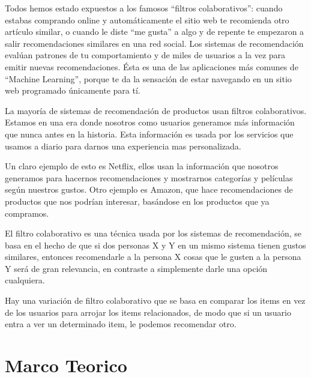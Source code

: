 \documentclass[preprint,12pt]{elsarticle}
\begin{document}
Todos hemos estado expuestos a los famosos “filtros colaborativos”: cuando estabas comprando online y automáticamente el sitio web te recomienda otro artículo similar, o cuando le diste “me gusta” a algo y de repente te empezaron a salir recomendaciones similares en una red social. Los sistemas de recomendación evalúan patrones de tu comportamiento y de miles de usuarios a la vez para emitir nuevas recomendaciones. Ésta es una de las aplicaciones más comunes de “Machine Learning”, porque te da la sensación de estar navegando en un sitio web programado únicamente para tí.

La mayoría de sistemas de recomendación de productos usan filtros colaborativos. Estamos en una era donde nosotros como usuarios generamos más información que nunca antes en la historia. Esta información es usada por los servicios que usamos a diario para darnos una experiencia mas personalizada.

Un claro ejemplo de esto es Netflix, ellos usan la información que nosotros generamos para hacernos recomendaciones y mostrarnos categorías y películas según nuestros gustos. Otro ejemplo es Amazon, que hace recomendaciones de productos que nos podrían interesar, basándose en los productos que ya compramos.

El filtro colaborativo es una técnica usada por los sistemas de recomendación, se basa en el hecho de que si dos personas X y Y en un mismo sistema tienen gustos similares, entonces recomendarle a la persona X cosas que le gusten a la persona Y será de gran relevancia, en contraste a simplemente darle una opción cualquiera.

Hay una variación de filtro colaborativo que se basa en comparar los items en vez de los usuarios para arrojar los items relacionados, de modo que si un usuario entra a ver un determinado item, le podemos recomendar otro.\\

\pagebreak
	
	

\section{Marco Teorico}
 
\end{document}
